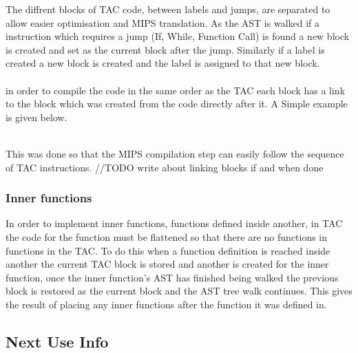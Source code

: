 \documentclass{article}
\begin{document}
The diffrent blocks of TAC code, between labels and jumps, are separated to allow
easier optimisation and MIPS translation. As the AST is walked if a instruction which
requires a jump (If, While, Function Call) is found a new block is created and set as the
current block after the jump. Similarly if a label is created a new block is created
and the label is assigned to that new block.\\~\\
in order to compile the code in the same order as the TAC each block has a link to
the block which was created from the code directly after it. A Simple example is
given below.\\~\\

\begin{center}
\end{center}

This was done so that the MIPS compilation step can easily follow the sequence of
TAC instructions. //TODO write about linking blocks if and when done

\subsubsection{Inner functions}

In order to implement inner functions, functions defined inside another, in TAC
the code for the function must be flattened so that there are no functions in functions
in the TAC. To do this when a function definition is reached inside another the current
TAC block is stored and another is created for the inner function, once the inner function's
AST has finished being walked the previous block is restored as the current block and
the AST tree walk continues. This gives the result of placing any inner functions after
the function it was defined in.

\subsection{Next Use Info}
\end{document}
